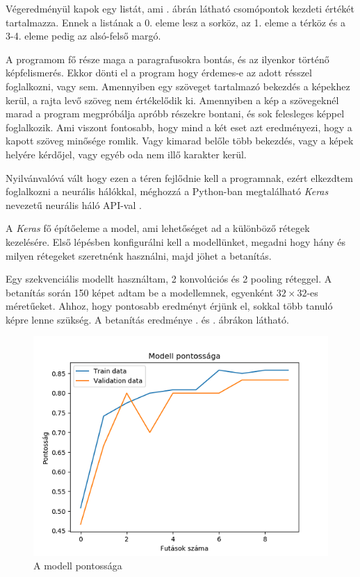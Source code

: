 Végeredményül kapok egy listát, ami . ábrán látható csomópontok kezdeti értékét tartalmazza. Ennek a listának a 0. eleme lesz a sorköz, az 1. eleme a térköz és a 3-4. eleme pedig az alsó-felső margó.


A programom fő része maga a paragrafusokra bontás, és az ilyenkor történő képfelismerés. Ekkor dönti el a program hogy érdemes-e az adott résszel foglalkozni, vagy sem. Amennyiben egy szöveget tartalmazó bekezdés a képekhez kerül, a rajta levő szöveg nem értékelődik ki. Amennyiben a kép a szövegeknél marad a program megpróbálja apróbb részekre bontani, és sok felesleges képpel foglalkozik. Ami viszont fontosabb, hogy mind a két eset azt eredményezi, hogy a kapott szöveg minősége romlik. Vagy kimarad belőle több bekezdés, vagy a képek helyére kérdőjel, vagy egyéb oda nem illő karakter kerül.

Nyilvánvalóvá vált hogy ezen a téren fejlődnie kell a programnak, ezért elkezdtem foglalkozni a neurális hálókkal, méghozzá a Python-ban megtalálható \textit{Keras} nevezetű neurális háló API-val \cite{gulli2017deep}.

A \textit{Keras} fő építőeleme a model, ami lehetőséget ad a különböző rétegek kezelésére. Első lépésben konfigurálni kell a modellünket, megadni hogy hány és milyen rétegeket szeretnénk használni, majd jöhet a betanítás.

Egy szekvenciális modellt használtam, 2 konvolúciós és 2 pooling réteggel. A betanítás során 150 képet adtam be a modellemnek, egyenként $32\times32$-es méretűeket. Ahhoz, hogy pontosabb eredményt érjünk el, sokkal több tanuló képre lenne szükség. A betanítás eredménye . és . ábrákon látható.

\begin{figure}[h!]
\centering
\includegraphics[scale=1]{images/accuracy.png}
\caption{A modell pontossága}
\label{fig:accuracy}
\end{figure}

